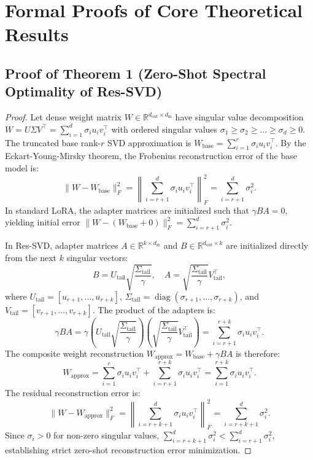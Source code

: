 \section{Formal Proofs of Core Theoretical Results}
\label{app:proofs}

\subsection{Proof of Theorem 1 (Zero-Shot Spectral Optimality of Res-SVD)}
\begin{proof}
Let dense weight matrix $W \in \mathbb{R}^{d_{\text{out}} \times d_{\text{in}}}$ have singular value decomposition $W = U \Sigma V^\top = \sum_{i=1}^d \sigma_i u_i v_i^\top$ with ordered singular values $\sigma_1 \ge \sigma_2 \ge \dots \ge \sigma_d \ge 0$.
The truncated base rank-$r$ SVD approximation is $W_{\text{base}} = \sum_{i=1}^r \sigma_i u_i v_i^\top$. By the Eckart-Young-Mirsky theorem, the Frobenius reconstruction error of the base model is:
\begin{equation}
\|W - W_{\text{base}}\|_F^2 = \left\| \sum_{i=r+1}^d \sigma_i u_i v_i^\top \right\|_F^2 = \sum_{i=r+1}^d \sigma_i^2.
\end{equation}
In standard LoRA, the adapter matrices are initialized such that $\gamma B A = 0$, yielding initial error $\|W - (W_{\text{base}} + 0)\|_F^2 = \sum_{i=r+1}^d \sigma_i^2$.

In Res-SVD, adapter matrices $A \in \mathbb{R}^{k \times d_{\text{in}}}$ and $B \in \mathbb{R}^{d_{\text{out}} \times k}$ are initialized directly from the next $k$ singular vectors:
\begin{equation}
B = U_{\text{tail}} \sqrt{\frac{\Sigma_{\text{tail}}}{\gamma}}, \quad A = \sqrt{\frac{\Sigma_{\text{tail}}}{\gamma}} V_{\text{tail}}^\top,
\end{equation}
where $U_{\text{tail}} = [u_{r+1}, \dots, u_{r+k}]$, $\Sigma_{\text{tail}} = \operatorname{diag}(\sigma_{r+1}, \dots, \sigma_{r+k})$, and $V_{\text{tail}} = [v_{r+1}, \dots, v_{r+k}]$.
The product of the adapters is:
\begin{equation}
\gamma B A = \gamma \left( U_{\text{tail}} \sqrt{\frac{\Sigma_{\text{tail}}}{\gamma}} \right) \left( \sqrt{\frac{\Sigma_{\text{tail}}}{\gamma}} V_{\text{tail}}^\top \right) = \sum_{i=r+1}^{r+k} \sigma_i u_i v_i^\top.
\end{equation}
The composite weight reconstruction $W_{\text{approx}} = W_{\text{base}} + \gamma B A$ is therefore:
\begin{equation}
W_{\text{approx}} = \sum_{i=1}^r \sigma_i u_i v_i^\top + \sum_{i=r+1}^{r+k} \sigma_i u_i v_i^\top = \sum_{i=1}^{r+k} \sigma_i u_i v_i^\top.
\end{equation}
The residual reconstruction error is:
\begin{equation}
\|W - W_{\text{approx}}\|_F^2 = \left\| \sum_{i=r+k+1}^d \sigma_i u_i v_i^\top \right\|_F^2 = \sum_{i=r+k+1}^d \sigma_i^2.
\end{equation}
Since $\sigma_i > 0$ for non-zero singular values, $\sum_{i=r+k+1}^d \sigma_i^2 < \sum_{i=r+1}^d \sigma_i^2$, establishing strict zero-shot reconstruction error minimization.
\end{proof}

